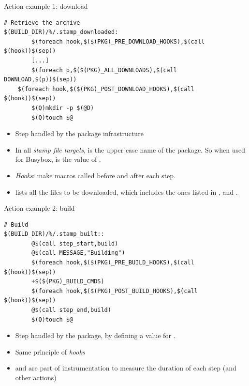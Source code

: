 \begin{frame}[fragile]{Action example 1: download}

\begin{block}{}
\begin{verbatim}
# Retrieve the archive
$(BUILD_DIR)/%/.stamp_downloaded:
        $(foreach hook,$($(PKG)_PRE_DOWNLOAD_HOOKS),$(call $(hook))$(sep))
        [...]
        $(foreach p,$($(PKG)_ALL_DOWNLOADS),$(call DOWNLOAD,$(p))$(sep))
	$(foreach hook,$($(PKG)_POST_DOWNLOAD_HOOKS),$(call $(hook))$(sep))
        $(Q)mkdir -p $(@D)
        $(Q)touch $@
\end{verbatim}
\end{block}

\begin{itemize}
\item Step handled by the package infrastructure
\item In all {\em stamp file targets},  is the upper case
  name of the package. So when used for Busybox,
   is the value of .
\item {\em Hooks}: make macros called before and after each step.
\item {} lists all the files to be downloaded,
  which includes the ones listed in ,
   and .
\end{itemize}

\end{frame}

\begin{frame}[fragile]{Action example 2: build}

\begin{block}{}
\begin{verbatim}
# Build
$(BUILD_DIR)/%/.stamp_built::
        @$(call step_start,build)
        @$(call MESSAGE,"Building")
        $(foreach hook,$($(PKG)_PRE_BUILD_HOOKS),$(call $(hook))$(sep))
        +$($(PKG)_BUILD_CMDS)
        $(foreach hook,$($(PKG)_POST_BUILD_HOOKS),$(call $(hook))$(sep))
        @$(call step_end,build)
        $(Q)touch $@
\end{verbatim}
\end{block}

\begin{itemize}
\item Step handled by the package, by defining a value for
  .
\item Same principle of {\em hooks}
\item {} and  are part of
  instrumentation to measure the duration of each step (and other
  actions)
\end{itemize}

\end{frame}

